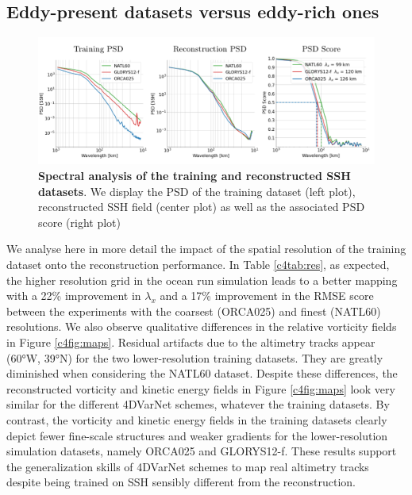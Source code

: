 \begin{bibunit}
\subsection{Eddy-present datasets versus eddy-rich ones}
\label{c4ssec:resolution}


\begin{figure}[H]
\small
\includegraphics[width=\linewidth]{./00_Simulearning/standalone_figures/psd_res.png}
\caption{
\textbf{Spectral analysis of the training and reconstructed SSH datasets}. We display the PSD of the training dataset (left plot), reconstructed SSH field (center plot) as well as the associated PSD score (right plot)}\vspace{-5mm}
\label{c4fig:respsd}
\end{figure}


We analyse here in more detail the impact of the spatial resolution of the training dataset onto the reconstruction performance. In Table \ref{c4tab:res}, as expected, the higher resolution grid in the ocean run simulation leads to a better mapping with a 22\% improvement in $\lambda_x$  and a 17\% improvement in the RMSE score between the experiments with the coarsest (ORCA025) and finest (NATL60) resolutions.
We also observe qualitative differences in the relative vorticity fields in Figure \ref{c4fig:maps}.  Residual artifacts due to the altimetry tracks appear (60°W, 39°N) for the two lower-resolution training datasets. They are greatly diminished when considering the NATL60 dataset. 
Despite these differences, the reconstructed vorticity and kinetic energy fields in Figure \ref{c4fig:maps} look very similar for the different 4DVarNet schemes, whatever the training datasets. By contrast, the vorticity and kinetic energy fields in the training datasets clearly depict fewer fine-scale structures and weaker gradients for the lower-resolution simulation datasets, namely ORCA025 and GLORYS12-f.
These results support the generalization skills of 4DVarNet schemes to map real altimetry tracks despite being trained on SSH sensibly different from the reconstruction. 


\end{bibunit}
